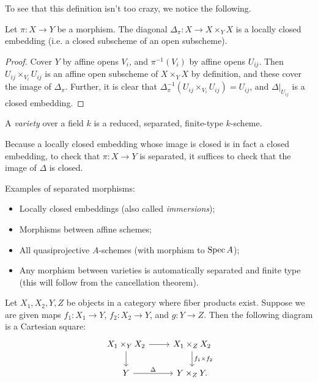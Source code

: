 \documentclass[11pt]{amsart}
\begin{document}
To see that this definition isn't too crazy, we notice the following.

\begin{prop}
Let $\pi:X\to Y$ be a morphism. The diagonal $\Delta_{\pi}: X\to X\times_Y X$ is a locally closed embedding (i.e. a closed subscheme of an open subscheme).
\end{prop}

\begin{proof}
Cover $Y$ by affine opens $V_i$, and $\pi^{-1}(V_i)$ by affine opens $U_{ij}$. Then $U_{ij}\times_{V_i} U_{ij}$ is an affine open subscheme of $X\times_Y X$ by definition, and these cover the image of $\Delta_{\pi}$. Further, it is clear that $\Delta_{\pi}^{-1}(U_{ij}\times_{V_i} U_{ij}) = U_{ij}$, and $\Delta|_{U_{ij}}$ is a closed embedding.
\end{proof}

\begin{defn}
A \emph{variety} over a field $k$ is a reduced, separated, finite-type $k$-scheme.
\end{defn}

Because a locally closed embedding whose image is closed is in fact a closed embedding, to check that $\pi:X\to Y$ is separated, it suffices to check that the image of $\Delta$ is closed.

Examples of separated morphisms:
\begin{itemize}
    \item Locally closed embeddings (also called \emph{immersions});
    \item Morphisms between affine schemes;
    \item All quasiprojective $A$-schemes (with morphism to $\operatorname{Spec} A$);
    \item Any morphism between varieties is automatically separated and finite type (this will follow from the cancellation theorem).
\end{itemize}

\begin{lem}
Let $X_1,X_2,Y,Z$ be objects in a category where fiber products exist. Suppose we are given maps $f_1:X_1\to Y$, $f_2:X_2\to Y$, and $g:Y\to Z$. Then the following diagram is a Cartesian square:
\[
\begin{tikzcd}
X_1\times_Y X_2 \arrow[r] \arrow[d] & X_1\times_Z X_2 \arrow[d, "f_1\times f_2"] \\
Y \arrow[r, "\Delta"] & Y\times_Z Y.
\end{tikzcd}
\]
\end{lem}
\end{document}
